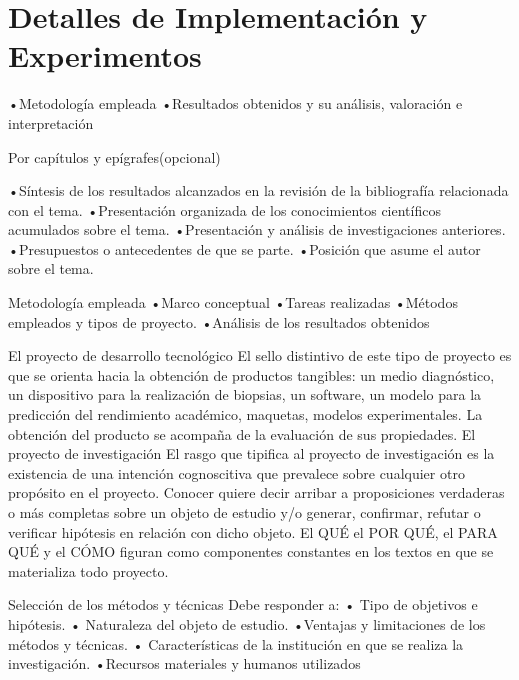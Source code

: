 \chapter{Detalles de Implementación y Experimentos}\label{chapter:implementation}

•Metodología empleada
•Resultados obtenidos y su análisis, 
valoración e interpretación

Por capítulos 
y epígrafes(opcional)

•Síntesis de los resultados alcanzados en la
revisión de la bibliografía relacionada con el
tema.
•Presentación organizada de los
conocimientos científicos acumulados sobre
el tema.
•Presentación y análisis de investigaciones
anteriores.
•Presupuestos o antecedentes de que se
parte.
•Posición que asume el autor sobre el tema.

Metodología empleada
•Marco conceptual
•Tareas realizadas
•Métodos empleados y tipos de 
proyecto.
•Análisis de los resultados obtenidos

El proyecto de desarrollo tecnológico
El sello distintivo de este tipo de proyecto es que se orienta hacia
la obtención de productos tangibles: un medio diagnóstico, un
dispositivo para la realización de biopsias, un software, un
modelo para la predicción del rendimiento académico,
maquetas, modelos experimentales.
La obtención del producto se acompaña de la evaluación de
sus propiedades.
El proyecto de investigación
El rasgo que tipifica al proyecto de investigación es la existencia de
una intención cognoscitiva que prevalece sobre cualquier otro
propósito en el proyecto. Conocer quiere decir arribar a
proposiciones verdaderas o más completas sobre un objeto de
estudio y/o generar, confirmar, refutar o verificar hipótesis en
relación con dicho objeto.
El QUÉ el POR QUÉ, el PARA QUÉ y el CÓMO figuran como
componentes constantes en los textos en que se materializa todo
proyecto.

Selección de los métodos y técnicas
Debe responder a:
• Tipo de objetivos e hipótesis.
• Naturaleza del objeto de estudio.
•Ventajas y limitaciones de los métodos y 
técnicas.
• Características de la institución en que se 
realiza la investigación.
•Recursos materiales y humanos utilizados
